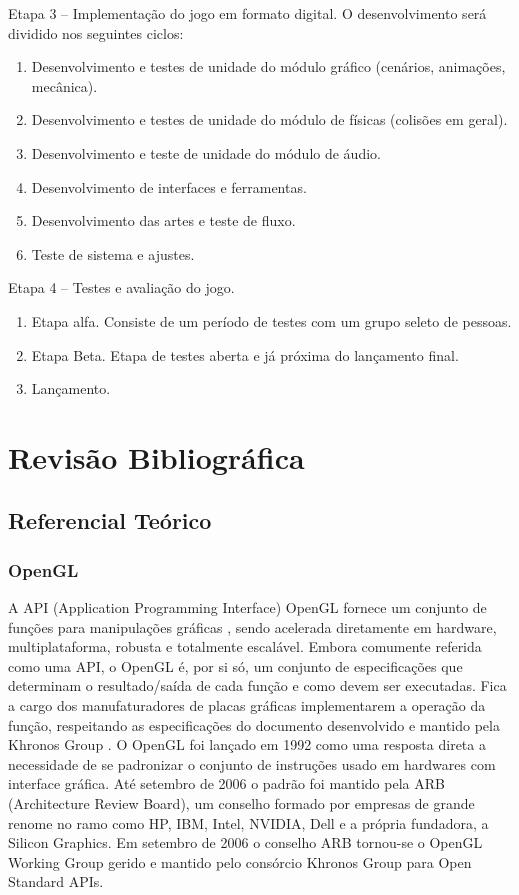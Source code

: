 \documentclass[12pt, 
openright, 
oneside, 
a4paper,    
brazil]{facom-ufu-abntex2}
\begin{document}
Etapa 3 – Implementação do jogo em formato digital. O desenvolvimento será dividido nos seguintes ciclos:
\begin{enumerate}
\item Desenvolvimento e testes de unidade do módulo gráfico
(cenários, animações, mecânica).
\item Desenvolvimento e testes de unidade do módulo de físicas
(colisões em geral).
\item Desenvolvimento e teste de unidade do módulo de áudio.
\item Desenvolvimento de interfaces e ferramentas.
\item Desenvolvimento das artes e teste de fluxo.
\item Teste de sistema e ajustes.
\end{enumerate}
Etapa 4 – Testes e avaliação do jogo.
\begin{enumerate}
\item Etapa alfa. Consiste de um período de testes com um grupo seleto de pessoas.
\item Etapa Beta. Etapa de testes aberta e já próxima do lançamento final.
\item Lançamento.
\end{enumerate}



\chapter{Revisão Bibliográfica}

\section{Referencial Teórico}
\label{sec:refteo}
\subsection{OpenGL}
A API (Application Programming Interface) OpenGL fornece um conjunto de funções para manipulações gráficas \cite{LearnOpenGL}, sendo acelerada diretamente em hardware, multiplataforma, robusta e totalmente escalável. Embora comumente referida como uma API, o OpenGL é, por si só, um conjunto de especificações que determinam o resultado/saída de cada função e como devem ser executadas. Fica a cargo dos manufaturadores de placas gráficas implementarem a operação da função, respeitando as especificações do documento desenvolvido e mantido pela Khronos Group \cite{KhronosOpenGLSpecification}.
 O OpenGL foi lançado em 1992 como uma resposta direta a necessidade de se padronizar o conjunto de instruções usado em hardwares com interface gráfica. Até setembro de 2006 o padrão foi mantido pela ARB (Architecture Review Board), um conselho formado por empresas de grande renome no ramo como HP, IBM, Intel, NVIDIA, Dell e a própria fundadora, a Silicon Graphics. Em setembro de 2006 o conselho ARB tornou-se o OpenGL Working Group gerido e mantido pelo consórcio Khronos Group para Open Standard APIs\cite{OpenGLAbout}.
 
\end{document}
